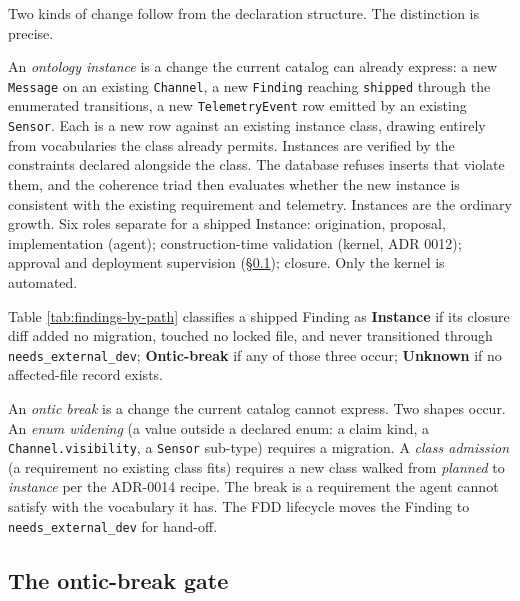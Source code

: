 \documentclass[conference,10pt]{IEEEtran}
\begin{document}
Two kinds of change follow from the declaration structure. The
distinction is precise.

An \emph{ontology instance} is a change the current catalog can already
express: a new \texttt{Message} on an existing \texttt{Channel}, a new \texttt{Finding}
reaching \texttt{shipped} through the enumerated transitions, a new
\texttt{TelemetryEvent} row emitted by an existing \texttt{Sensor}. Each is a new
row against an existing instance class, drawing entirely from
vocabularies the class already permits. Instances are verified by the constraints declared
alongside the class. The database refuses inserts that violate them, and
the coherence triad then evaluates whether the new instance is
consistent with the existing requirement and telemetry. Instances are the ordinary growth. Six roles separate for a shipped Instance: origination, proposal, implementation (agent); construction-time validation (kernel, ADR 0012); approval and deployment supervision (§\ref{sec:ontic-gate}); closure. Only the kernel is automated.

Table \ref{tab:findings-by-path} classifies a shipped Finding as \textbf{Instance} if its closure diff added no migration, touched no locked file, and never transitioned through \texttt{needs\_external\_dev}; \textbf{Ontic-break} if any of those three occur; \textbf{Unknown} if no affected-file record exists.

An \emph{ontic break} is a change the current catalog cannot express. Two
shapes occur. An \emph{enum widening} (a value outside a declared enum: a
claim kind, a \texttt{Channel.visibility}, a \texttt{Sensor} sub-type) requires a
migration. A \emph{class admission} (a requirement no existing class fits)
requires a new class walked from \emph{planned} to \emph{instance} per the
ADR-0014 recipe. The break is a requirement the agent cannot satisfy
with the vocabulary it has. The FDD lifecycle moves the Finding to
\texttt{needs\_external\_dev} for hand-off.

\subsection{The ontic-break gate}\label{sec:ontic-gate}
\end{document}
